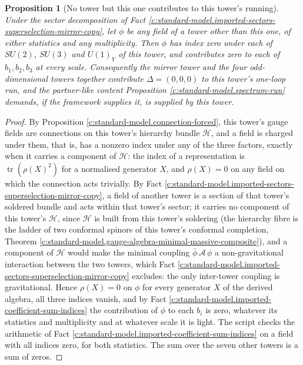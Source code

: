 \documentclass[11pt]{article}
\newtheorem{proposition}[theorem]{Proposition}
\theoremstyle{definition}
\theoremstyle{plain}
\providecommand{\Dl}{}\renewcommand{\Dl}{\Delta}
\providecommand{\tr}{}\renewcommand{\tr}{\operatorname{tr}}
\begin{document}
\begin{proposition}[No tower but this one contributes to this tower's running]\label{c:standard-model.no-tower-but-one-contributes-towers}
Under the sector decomposition of Fact \ref{c:standard-model.imported-sectors-superselection-mirror-copy}, let $\phi$ be any field of a tower other than this one, of either statistics and any multiplicity. Then $\phi$ has index zero under each of $SU(2)$, $SU(3)$ and $U(1)_{Y}$ of this tower, and contributes zero to each of $b_{1}, b_{2}, b_{3}$ at every scale. Consequently the mirror tower and the four odd-dimensional towers together contribute $\Dl = (0, 0, 0)$ to this tower's one-loop run, and the partner-like content Proposition \ref{c:standard-model.spectrum-run} demands, if the framework supplies it, is supplied by this tower.
\end{proposition}
\begin{proof}
By Proposition \ref{c:standard-model.connection-forced}, this tower's gauge fields are connections on this tower's hierarchy bundle $\mathcal{H}$, and a field is charged under them, that is, has a nonzero index under any of the three factors, exactly when it carries a component of $\mathcal{H}$: the index of a representation is $\tr(\rho(X)^{2})$ for a normalised generator $X$, and $\rho(X) = 0$ on any field on which the connection acts trivially. By Fact \ref{c:standard-model.imported-sectors-superselection-mirror-copy}, a field of another tower is a section of that tower's soldered bundle and acts within that tower's sector; it carries no component of this tower's $\mathcal{H}$, since $\mathcal{H}$ is built from this tower's soldering (the hierarchy fibre is the ladder of two conformal spinors of this tower's conformal completion, Theorem \ref{c:standard-model.gauge-algebra-minimal-massive-composite}), and a component of $\mathcal{H}$ would make the minimal coupling $\bar{\phi}\,\mathcal{A}\,\phi$ a non-gravitational interaction between the two towers, which Fact \ref{c:standard-model.imported-sectors-superselection-mirror-copy} excludes: the only inter-tower coupling is gravitational. Hence $\rho(X) = 0$ on $\phi$ for every generator $X$ of the derived algebra, all three indices vanish, and by Fact \ref{c:standard-model.imported-coefficient-sum-indices} the contribution of $\phi$ to each $b_{i}$ is zero, whatever its statistics and multiplicity and at whatever scale it is light. The script checks the arithmetic of Fact \ref{c:standard-model.imported-coefficient-sum-indices} on a field with all indices zero, for both statistics. The sum over the seven other towers is a sum of zeros.

\end{proof}
\end{document}
